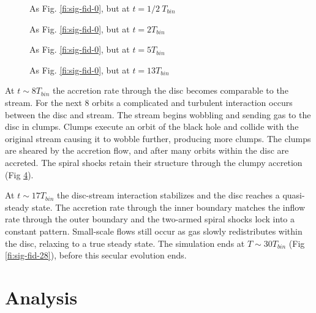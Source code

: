\documentclass{emulateapj}
\begin{document}
\begin{figure}
\caption{\label{fi:sig-fid-05} As Fig. \ref{fi:sig-fid-0}, but at $t = 1/2\ T_{bin}$}
\end{figure}

\begin{figure}
\caption{\label{fi:sig-fid-2} As Fig. \ref{fi:sig-fid-0}, but at $t = 2 T_{bin}$}
\end{figure}

\begin{figure}
\caption{\label{fi:sig-fid-5} As Fig. \ref{fi:sig-fid-0}, but at $t = 5 T_{bin}$}
\end{figure}

\begin{figure}
\caption{\label{fi:sig-fid-13} As Fig. \ref{fi:sig-fid-0}, but at $t = 13 T_{bin}$}
\end{figure}

At $t\sim 8 T_{bin}$ the accretion rate through the disc becomes comparable to the stream.  For the next 8 orbits a complicated and turbulent interaction occurs between the disc and stream.  The stream begins wobbling and sending gas to the disc in clumps.  Clumps execute an orbit of the black hole and collide with the original stream causing it to wobble further, producing more clumps.  The clumps are sheared by the accretion flow, and after many orbits within the disc are accreted. The spiral shocks retain their structure through the clumpy accretion (Fig \ref{fi:sig-fid-13}).

At $t\sim17 T_{bin}$ the disc-stream interaction stabilizes and the disc reaches a quasi-steady state.  The accretion rate through the inner boundary matches the inflow rate through the outer boundary and the two-armed spiral shocks lock into a constant pattern.  Small-scale flows still occur as gas slowly redistributes within the disc, relaxing to a true steady state.  The simulation ends at $T\sim30 T_{bin}$ (Fig \ref{fi:sig-fid-28}), before this secular evolution ends.

\begin{figure*}
\caption{\label{fi:sig-fid-28} As Fig. \ref{fi:sig-fid-0}, but at $t = 28 T_{bin}$}
\end{figure*}



\section{Analysis}
\label{sec:analysis}
\end{document}
